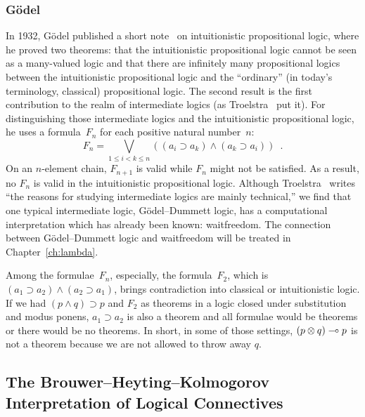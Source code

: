\subsubsection{G\"odel}
In 1932, G\"odel published a short note~\cite{godelprop} on intuitionistic propositional
logic, where he proved two theorems: that the intuitionistic propositional logic
cannot be seen as a many-valued logic and that
there are infinitely many propositional logics between the
intuitionistic propositional logic and the ``ordinary'' (in today's
terminology, classical) propositional logic.  The second result is the
first contribution to the realm of intermediate logics (as
Troelstra~\cite[p.~223]{goedelcollected} put it).
For distinguishing those intermediate logics and the intuitionistic
propositional logic, he uses a formula~$F_n$ for each positive natural
number~$n$:
\[
 F_n = \bigvee_{1\le i < k\le n}\left((a_i\supset a_k) \land (a_k\supset a_i)\right)\enspace.
\]
On an $n$-element chain, $F_{n+1}$ is valid while $F_n$ might not be
satisfied.  As a result, no $F_n$ is valid in the intuitionistic
propositional logic.
Although Troelstra~\cite[p.~223]{goedelcollected} writes ``the reasons
for studying intermediate logics are mainly technical,'' we find that
one typical intermediate logic, G\"odel--Dummett logic, has a
computational interpretation which has already been known: waitfreedom.
The connection between G\"odel--Dummett logic and waitfreedom will be
treated in Chapter~\ref{ch:lambda}.

Among the formulae~$F_n$,
especially, the formula~$F_2$, which is $(a_1\supset a_2)\land (a_2\supset
a_1)$, brings contradiction into classical or intuitionistic logic.  If we
had $(p\land q)\supset p$ and $F_2$ as theorems in a logic closed under
substitution and modus ponens,
$a_1\supset a_2$ is also a theorem and all formulae would be theorems or
there would be no theorems.
In short, in some of those settings, $(p\otimes q)\multimap p$ is
not a theorem because we are not
allowed to throw away $q$.

\subsection{The Brouwer--Heyting--Kolmogorov Interpretation of Logical Connectives}

